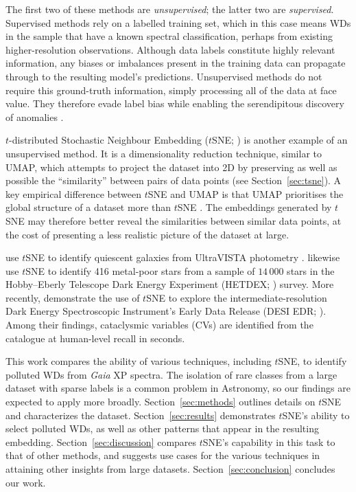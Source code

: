 \documentclass[fleqn,usenatbib]{rasti}
\begin{document}
The first two of these methods are \textit{unsupervised}; the latter two are \textit{supervised}.
Supervised methods rely on a labelled training set, which in this case means WDs in the sample that have a known spectral classification, perhaps from existing higher-resolution observations.
Although data labels constitute highly relevant information, any biases or imbalances present in the training data can propagate through to the resulting model's predictions.
Unsupervised methods do not require this ground-truth information, simply processing all of the data at face value.
They therefore evade label bias while enabling the serendipitous discovery of anomalies \citep[e.g.,][]{giles19, webb20}.

$t$-distributed Stochastic Neighbour Embedding ($t$SNE; \citealt{vandermaaten08}) is another example of an unsupervised method.
It is a dimensionality reduction technique, similar to UMAP, which attempts to project the dataset into 2D by preserving as well as possible the ``similarity'' between pairs of data points (see Section~\ref{sec:tsne}).
A key empirical difference between $t$SNE and UMAP is that UMAP prioritises the global structure of a dataset more than $t$SNE \citep{mcinnes18, fotopoulou24}.
The embeddings generated by $t$SNE may therefore better reveal the similarities between similar data points, at the cost of presenting a less realistic picture of the dataset at large.

\citet{steinhardt20} use $t$SNE to identify quiescent galaxies from UltraVISTA photometry \citep{mccracken12}.
\citet{hawkins21} likewise use $t$SNE to identify 416 metal-poor stars from a sample of $14\,000$ stars in the Hobby–Eberly Telescope Dark Energy Experiment (HETDEX; \citealt{gebhardt21}) survey.
More recently, \citet{byrne24c} demonstrate the use of $t$SNE to explore the intermediate-resolution Dark Energy Spectroscopic Instrument's Early Data Release (DESI EDR; \citealt{desiedr}).
Among their findings, cataclysmic variables (CVs) are identified from the catalogue at human-level recall in seconds.

This work compares the ability of various techniques, including $t$SNE, to identify polluted WDs from \textit{Gaia} XP spectra.
The isolation of rare classes from a large dataset with sparse labels is a common problem in Astronomy, so our findings are expected to apply more broadly.
Section~\ref{sec:methods} outlines details on $t$SNE and characterizes the dataset.
Section~\ref{sec:results} demonstrates $t$SNE's ability to select polluted WDs, as well as other patterns that appear in the resulting embedding.
Section~\ref{sec:discussion} compares $t$SNE's capability in this task to that of other methods, and suggests use cases for the various techniques in attaining other insights from large datasets.
Section~\ref{sec:conclusion} concludes our work.
\end{document}
